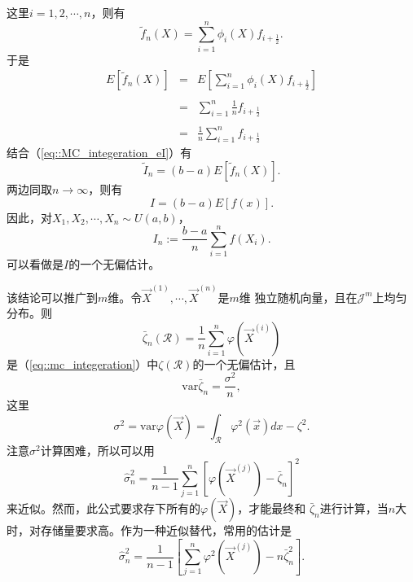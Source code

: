 这里$i = 1, 2, \cdots, n$，则有
$$
\tilde{f}_n(X) = \sum_{i = 1}^n \phi_i(X) f_{i + \frac{1}{2}}.
$$
于是
$$
\begin{array}{rcl}
  E[\tilde{f}_n(X)] &=& \displaystyle E\left[\sum_{i = 1}^n \phi_i(X) f_{i + \frac{1}{2}}\right]\\\\
  &=& \displaystyle \sum_{i = 1}^n \frac{1}{n} f_{i + \frac{1}{2}} \\\\
  &=& \displaystyle \frac{1}{n}\sum_{i = 1}^nf_{i + \frac{1}{2}}
\end{array}
$$
结合（\ref{eq::MC_integeration_eI}）有
$$
\tilde{I}_n = (b - a) E[\tilde{f}_n(X)].
$$
两边同取$n \to \infty$，则有
\begin{equation}
  I = (b - a) E[f(x)].
  \label{eq::MC_integeration_source}
\end{equation}
因此，对$X_1, X_2, \cdots, X_n \sim U(a, b)$，
\begin{equation}
  I_n := \frac{b - a}{n} \sum_{i = 1}^n f(X_i).
  \label{eq::MC_integeration_estimation}
\end{equation}
可以看做是$I$的一个无偏估计。

该结论可以推广到$m$维。令$\vec{X}^{(1)}, \cdots, \vec{X}^{(n)}$是$m$维
独立随机向量，且在$\mathscr{J}^m$上均匀分布。则
\begin{equation}
  \bar{\zeta}_n(\mathscr{R}) = \frac{1}{n} \sum_{i = 1}^n \varphi(\vec{X}^{(i)})
  \label{eq::bar_zeta_n}
\end{equation}
是（\ref{eq::mc_integeration}）中$\zeta(\mathscr{R})$的一个无偏估计，且
\begin{equation}
  \mathrm{var} \bar{\zeta}_n = \frac{\sigma^2}{n},
  \label{eq::var_zeta_n}
\end{equation}
这里
\begin{equation}
  \sigma^2 = \mathrm{var} \varphi(\vec{X}) = \int_{\mathscr{R}} \varphi^2(\vec{x})dx - \zeta^2.
  \label{eq::zeta_sigma_2}
\end{equation}
注意$\sigma^2$计算困难，所以可以用
\begin{equation}
  \hat{\sigma}^2_n = \frac{1}{n - 1}\sum_{j = 1}^n\left[\varphi(\vec{X}^{(j)}) - \bar{\zeta}_n\right]^2
  \label{eq::zeta_hat_sigma_2_store}
\end{equation}
来近似。然而，此公式要求存下所有的$\varphi(\vec{X})$，才能最终和
$\bar{\zeta}_n$进行计算，当$n$大时，对存储量要求高。作为一种近似替代，常用的估计是
\begin{equation}
  \hat{\sigma}^2_n = \frac{1}{n - 1}\left[\sum_{j = 1}^n \varphi^2(\vec{X}^{(j)}) - n \bar{\zeta}^2_n\right].
  \label{eq::zeta_hat_sigma_2_encount}
\end{equation}

